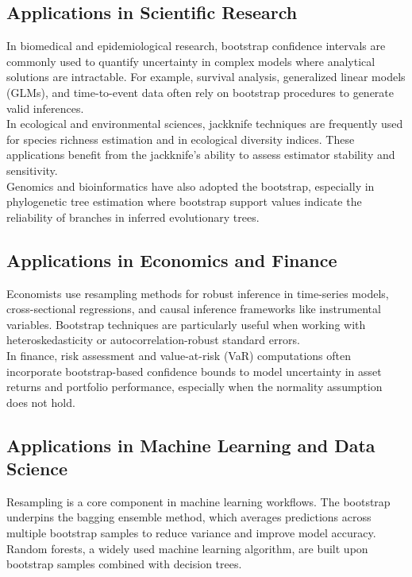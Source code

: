 \documentclass{article}
\begin{document}
\subsection{Applications in Scientific Research}

In biomedical and epidemiological research, bootstrap confidence intervals are commonly used to quantify uncertainty in complex models where analytical solutions are intractable. For example, survival analysis, generalized linear models (GLMs), and time-to-event data often rely on bootstrap procedures to generate valid inferences.\\

In ecological and environmental sciences, jackknife techniques are frequently used for species richness estimation and in ecological diversity indices. These applications benefit from the jackknife's ability to assess estimator stability and sensitivity.\\

Genomics and bioinformatics have also adopted the bootstrap, especially in phylogenetic tree estimation where bootstrap support values indicate the reliability of branches in inferred evolutionary trees. \\

\subsection{Applications in Economics and Finance}

Economists use resampling methods for robust inference in time-series models, cross-sectional regressions, and causal inference frameworks like instrumental variables. Bootstrap techniques are particularly useful when working with heteroskedasticity or autocorrelation-robust standard errors. \\

In finance, risk assessment and value-at-risk (VaR) computations often incorporate bootstrap-based confidence bounds to model uncertainty in asset returns and portfolio performance, especially when the normality assumption does not hold. \\

\subsection{Applications in Machine Learning and Data Science}

Resampling is a core component in machine learning workflows. The bootstrap underpins the bagging ensemble method, which averages predictions across multiple bootstrap samples to reduce variance and improve model accuracy. Random forests, a widely used machine learning algorithm, are built upon bootstrap samples combined with decision trees. \\
\end{document}
